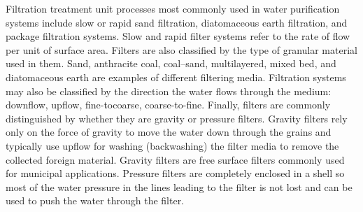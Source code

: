 \documentclass{article}
\begin{document}
Filtration treatment unit processes most commonly used in water purification systems include slow or rapid sand filtration, diatomaceous earth filtration, and package filtration systems. Slow and rapid filter systems refer to the rate of flow per unit of surface area. Filters are also classified by the type of granular material used in them. Sand, anthracite coal, coal–sand, multilayered, mixed bed, and diatomaceous earth are examples of different filtering media. Filtration systems may also be classified by the direction the water flows through the medium: downflow, upflow, fine-tocoarse, coarse-to-fine. Finally, filters are commonly distinguished by whether they are gravity or pressure filters. Gravity filters rely only on the force of gravity to move the water down through the grains and typically use upflow for washing (backwashing) the filter media to remove the collected foreign material. Gravity filters are free surface filters commonly used for municipal applications. Pressure filters are completely enclosed in a shell so most of the water pressure in the lines leading to the filter is not lost and can be used to push the water through the filter.\\
\end{document}
